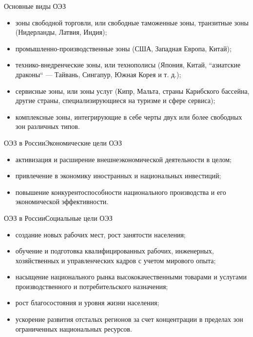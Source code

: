 \documentclass[_Venture_p3.tex]{subfiles}
\begin{document}
\begin{frame}[allowframebreaks]{Основные виды ОЭЗ}{}
\begin{itemize}
	\item зоны свободной торговли, или свободные таможенные зоны, транзитные зоны (Нидерланды, Латвия, Индия);
	\item промышленно-производственные зоны (США, Западная Европа, Китай);
	\item технико-внедренческие зоны, или технополисы (Япония, Китай, ``азиатские драконы`` — Тайвань, Сингапур, Южная Корея и т. д.);
	\item сервисные зоны, или зоны услуг (Кипр, Мальта, страны Карибского бассейна, другие страны, специализирующиеся на туризме и сфере сервиса);
	\item комплексные зоны, интегрирующие в себе черты двух или более свободных зон различных типов.
\end{itemize}
\end{frame}

\begin{frame}{ОЭЗ в России}{Экономические цели ОЭЗ}
\begin{itemize}
	\item активизация и расширение внешнеэкономической деятельности в целом;
	\item привлечение в экономику иностранных и национальных инвестиций;
	\item повышение конкурентоспособности национального производства и его экономической эффективности.
\end{itemize}
\end{frame}



\begin{frame}[allowframebreaks]{ОЭЗ в России}{Социальные цели ОЭЗ}
\begin{itemize}
	\item создание новых рабочих мест, рост занятости населения;
	\item обучение и подготовка квалифицированных рабочих, инженерных, хозяйственных и управленческих кадров с учетом мирового опыта;

	\pagebreak
	\item насыщение национального рынка высококачественными товарами и услугами производственного и потребительского назначения;
	\item рост благосостояния и уровня жизни населения;
	
	\pagebreak
	\item ускорение развития отсталых регионов за счет концентрации в пределах зон ограниченных национальных ресурсов.
\end{itemize}
\end{frame}
\end{document}
